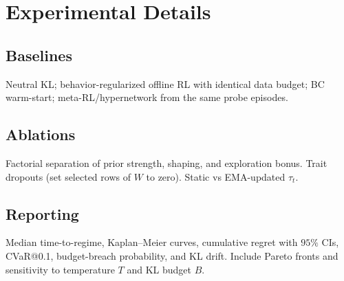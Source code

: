 \documentclass[10pt]{article}
\theoremstyle{plain}
\theoremstyle{definition}
\theoremstyle{remark}
\newcommand{\1}{\mathds{1}}
\begin{document}
\section{Experimental Details}
\subsection*{Baselines}
Neutral KL; behavior-regularized offline RL with identical data budget; BC warm-start; meta-RL/hypernetwork from the same probe episodes.

\subsection*{Ablations}
Factorial separation of prior strength, shaping, and exploration bonus. Trait dropouts (set selected rows of $W$ to zero). Static vs EMA-updated $\tau_t$.

\subsection*{Reporting}
Median time-to-regime, Kaplan--Meier curves, cumulative regret with $95\%$ CIs, CVaR@0.1, budget-breach probability, and KL drift. Include Pareto fronts and sensitivity to temperature $T$ and KL budget $B$.
\end{document}
